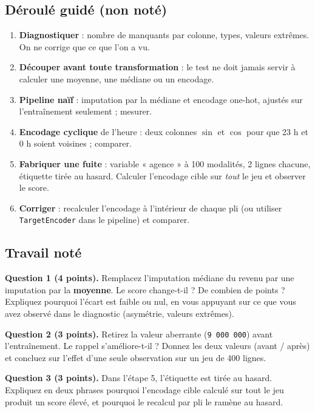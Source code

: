 \documentclass[10pt,a4paper]{article}
\begin{document}
\subsection*{Déroulé guidé (non noté)}
\begin{enumerate}
  \item \textbf{Diagnostiquer} : nombre de manquants par colonne, types, valeurs
        extrêmes. On ne corrige que ce que l'on a vu.
  \item \textbf{Découper avant toute transformation} : le test ne doit jamais
        servir à calculer une moyenne, une médiane ou un encodage.
  \item \textbf{Pipeline naïf} : imputation par la médiane et encodage one-hot,
        ajustés sur l'entraînement seulement ; mesurer.
  \item \textbf{Encodage cyclique} de l'heure : deux colonnes $\sin$ et $\cos$
        pour que 23 h et 0 h soient voisines ; comparer.
  \item \textbf{Fabriquer une fuite} : variable « agence » à 100 modalités,
        2 lignes chacune, étiquette tirée au hasard. Calculer l'encodage cible
        sur \emph{tout} le jeu et observer le score.
  \item \textbf{Corriger} : recalculer l'encodage à l'intérieur de chaque pli
        (ou utiliser \texttt{TargetEncoder} dans le pipeline) et comparer.
\end{enumerate}

\subsection*{Travail noté}
\begin{bareme}
\textbf{Question 1 (4 points).}
Remplacez l'imputation médiane du revenu par une imputation par la
\textbf{moyenne}. Le score change-t-il ? De combien de points ? Expliquez
pourquoi l'écart est faible ou nul, en vous appuyant sur ce que vous avez
observé dans le diagnostic (asymétrie, valeurs extrêmes).
\end{bareme}

\begin{bareme}
\textbf{Question 2 (3 points).}
Retirez la valeur aberrante (\texttt{9\,000\,000}) avant l'entraînement.
Le rappel s'améliore-t-il ? Donnez les deux valeurs (avant / après) et concluez
sur l'effet d'une seule observation sur un jeu de 400 lignes.
\end{bareme}

\begin{bareme}
\textbf{Question 3 (3 points).}
Dans l'étape 5, l'étiquette est tirée au hasard. Expliquez en deux phrases
pourquoi l'encodage cible calculé sur tout le jeu produit un score élevé, et
pourquoi le recalcul par pli le ramène au hasard.
\end{bareme}
\end{document}
